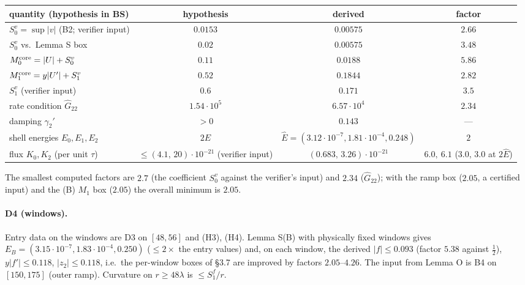 \documentclass[11pt]{article}
\theoremstyle{definition}
\theoremstyle{remark}
\begin{document}
\begin{center}\small\begin{tabular}{@{}lccc@{}}\toprule
quantity (hypothesis in BS) & hypothesis & derived & factor\\\midrule
$S_0^v=\sup|v|$ (B2; verifier input) & $0.0153$ & $0.00575$ & $2.66$\\
$S_0^v$ vs.\ Lemma S box & $0.02$ & $0.00575$ & $3.48$\\
$M_0^{\rm core}=|U|+S_0^v$ & $0.11$ & $0.0188$ & $5.86$\\
$M_1^{\rm core}=y|U'|+S_1^v$ & $0.52$ & $0.1844$ & $2.82$\\
$S_1^v$ (verifier input) & $0.6$ & $0.171$ & $3.5$\\
rate condition $\hat G_{22}$ & $1.54\cdot10^5$ & $6.57\cdot10^4$ & $2.34$\\
damping $\gamma_2'$ & $>0$ & $0.143$ & ---\\
shell energies $E_0,E_1,E_2$ & $2\hat E$ & $\hat E=(3.12\cdot10^{-7},1.81\cdot10^{-4},0.248)$ & $2$\\
flux $K_0,K_2$ (per unit $\tau$) & $\le(4.1,\,20)\cdot10^{-21}$ (verifier input) & $(0.683,\,3.26)\cdot10^{-21}$ & $6.0,\ 6.1$ ($3.0,\,3.0$ at $2\hat E$)\\\bottomrule\end{tabular}\end{center}
The smallest computed factors are $2.7$ (the coefficient $S_0^v$ against the verifier's input) and $2.34$ ($\hat G_{22}$); with the ramp box ($2.05$, a certified input) and the (B) $M_1$ box ($2.05$) the overall minimum is $2.05$.

\paragraph{D4 (windows).} Entry data on the windows are D3 on $[48,56]$ and (H3), (H4). Lemma S(B) with physically fixed windows gives $E_B=(3.15\cdot10^{-7},1.83\cdot10^{-4},0.250)$ ($\le2\times$ the entry values) and, on each window, the derived $|f|\le0.093$ (factor $5.38$ against $\tfrac12$), $y|f'|\le0.118$, $|z_2|\le0.118$, i.e.\ the per-window boxes of \S3.7 are improved by factors $2.05$--$4.26$. The input from Lemma O is B4 on $[150,175]$ (outer ramp). Curvature on $r\ge48\lambda$ is $\le S_1^f/r$.
\end{document}
